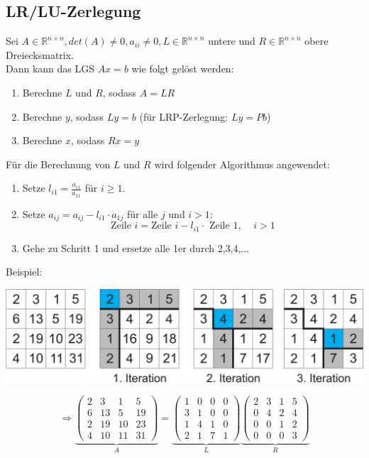 \documentclass[a4paper,twocolumn,10pt]{article}
\begin{document}
\subsection{LR/LU-Zerlegung}
Sei $A\in\mathbb{R}^{n\times n}, det(A)\neq 0,a_{ii}\neq 0, L\in\mathbb{R}^{n\times n}$ untere und $R\in\mathbb{R}^{n\times n}$ obere Dreiecksmatrix.\\
Dann kann das LGS $Ax=b$ wie folgt gelöst werden:
\begin{enumerate}
\item Berechne $L$ und $R$, sodass $A=LR$
\item Berechne $y$, sodass $Ly=b$ (für LRP-Zerlegung: $Ly=Pb$)
\item Berechne $x$, sodass $Rx=y$
\end{enumerate}
Für die Berechnung von $L$ und $R$ wird folgender Algorithmus angewendet:
\begin{enumerate}
\item Setze $l_{i1}=\frac{a_{i1}}{a_{11}}$ für $i\geq 1$.
\item Setze $a_{ij}=a_{ij}-l_{i1}\cdot a_{1j}$ für alle $j$ und $i>1$:
\begin{equation*}
\text{Zeile }i=\text{Zeile }i-l_{i1}\cdot \text{ Zeile }1,\;\;\;\;i>1
\end{equation*}
\item Gehe zu Schritt 1 und ersetze alle 1er durch 2,3,4,...
\end{enumerate}
\vspace{0.3cm}
Beispiel:
\begin{center}
\includegraphics[width=0.95\columnwidth]{Grafiken/LU-Zerlegung}
\end{center}
\begin{equation*}
\Rightarrow\underbrace{\begin{pmatrix}2 & 3 & 1 & 5 \\ 6 & 13 & 5 & 19 \\ 2 & 19 & 10 & 23 \\ 4 & 10 & 11 & 31\end{pmatrix}}_{A}=\underbrace{\begin{pmatrix}1 & 0 & 0 & 0 \\ 3 & 1 & 0 & 0 \\ 1 & 4 & 1 & 0 \\ 2 & 1 & 7 & 1\end{pmatrix}}_{L}\underbrace{\begin{pmatrix}2 & 3 & 1 & 5 \\ 0 & 4 & 2 & 4 \\ 0 & 0 & 1 & 2 \\ 0 & 0 & 0 & 3\end{pmatrix}}_{R}
\end{equation*}
\end{document}
